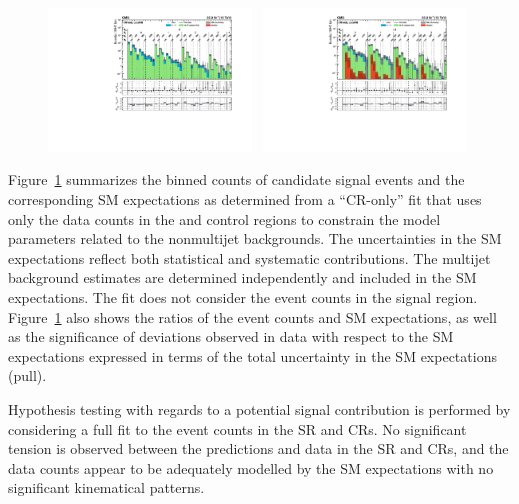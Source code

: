 \begin{figure}[!t]
  \includegraphics[width=0.48\textwidth, trim=10 0 60 10, clip=true]{Figures/5jet_cr-only.pdf}~
  \includegraphics[width=0.48\textwidth, trim=10 0 60 10, clip=true]{Figures/6jet_cr-only.pdf}\\
  \label{fig:result}
\end{figure}

Figure~\ref{fig:result} summarizes the binned counts of candidate
signal events and the corresponding SM expectations as determined from
a ``CR-only'' fit that uses only the data counts in the \mj and \mmj
control regions to constrain the model parameters related to the
nonmultijet backgrounds. The uncertainties in the SM expectations
reflect both statistical and systematic contributions. The multijet
background estimates are determined independently and included in the
SM expectations. The fit does not consider the event counts in the
signal region. Figure~\ref{fig:result} also shows the ratios of the
event counts and SM expectations, as well as the significance of
deviations observed in data with respect to the SM expectations
expressed in terms of the total uncertainty in the SM expectations
(pull).

Hypothesis testing with regards to a potential signal contribution is
performed by considering a full fit to the event counts in the SR and
CRs. 
No significant tension is observed between the predictions and data in
the SR and CRs, and the data counts appear to be adequately modelled
by the SM expectations with no significant kinematical patterns.

